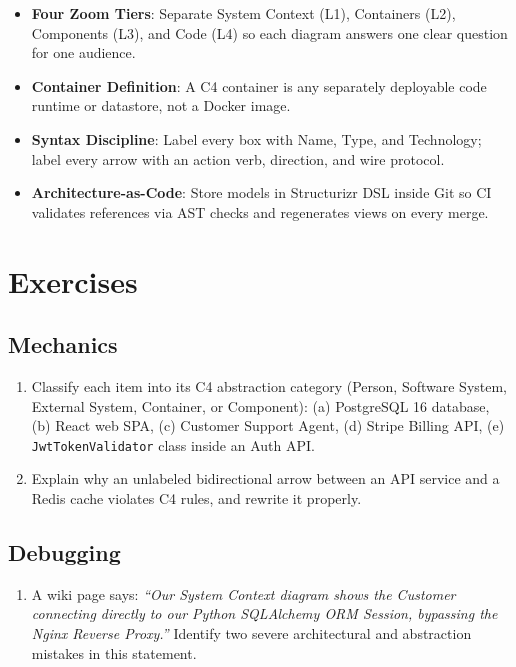 \begin{itemize}[leftmargin=18pt]
  \item \textbf{Four Zoom Tiers}: Separate System Context (L1), Containers (L2), Components (L3), and Code (L4) so each diagram answers one clear question for one audience.
  \item \textbf{Container Definition}: A C4 container is any separately deployable code runtime or datastore, not a Docker image.
  \item \textbf{Syntax Discipline}: Label every box with Name, Type, and Technology; label every arrow with an action verb, direction, and wire protocol.
  \item \textbf{Architecture-as-Code}: Store models in Structurizr DSL inside Git so CI validates references via AST checks and regenerates views on every merge.
\end{itemize}

\section{Exercises}

\subsection*{Mechanics}
\begin{enumerate}[label=\textbf{Exercise~\thechapter.\arabic*}, leftmargin=*]
  \item Classify each item into its C4 abstraction category (Person, Software System, External System, Container, or Component): (a) PostgreSQL 16 database, (b) React web SPA, (c) Customer Support Agent, (d) Stripe Billing API, (e) \texttt{JwtTokenValidator} class inside an Auth API.
  \item Explain why an unlabeled bidirectional arrow between an API service and a Redis cache violates C4 rules, and rewrite it properly.
\end{enumerate}

\subsection*{Debugging}
\begin{enumerate}[label=\textbf{Exercise~\thechapter.\arabic*}, leftmargin=*, start=3]
  \item A wiki page says: \textit{``Our System Context diagram shows the Customer connecting directly to our Python SQLAlchemy ORM Session, bypassing the Nginx Reverse Proxy.''} Identify two severe architectural and abstraction mistakes in this statement.
\end{enumerate}

